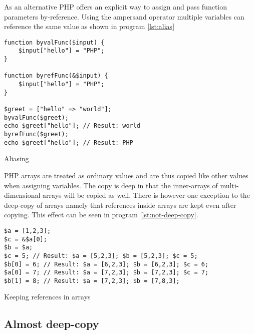 As an alternative PHP offers an explicit way to assign and pass function parameters by-reference. Using the ampersand operator multiple variables can reference the same value as shown in program \ref{lst:alias}

\begin{program}
\begin{lstlisting}
function byvalFunc($input) {
    $input["hello"] = "PHP";
}

function byrefFunc(&$input) {
    $input["hello"] = "PHP";
}

$greet = ["hello" => "world"];
byvalFunc($greet);
echo $greet["hello"]; // Result: world
byrefFunc($greet);
echo $greet["hello"]; // Result: PHP
\end{lstlisting}
\caption{Aliasing}
\label{lst:alias}
\end{program}

PHP arrays are treated as ordinary values and are thus copied like other values when assigning variables. The copy is deep in that the inner-arrays of multi-dimensional arrays will be copied as well. There is however one exception to the deep-copy of arrays namely that references inside arrays are kept even after copying. This effect can be seen in program \ref{lst:not-deep-copy}.

\begin{program}
\begin{lstlisting}
$a = [1,2,3];
$c = &$a[0];
$b = $a;
$c = 5; // Result: $a = [5,2,3]; $b = [5,2,3]; $c = 5;
$b[0] = 6; // Result: $a = [6,2,3]; $b = [6,2,3]; $c = 6;
$a[0] = 7; // Result: $a = [7,2,3]; $b = [7,2,3]; $c = 7;
$b[1] = 8; // Result: $a = [7,2,3]; $b = [7,8,3];
\end{lstlisting}
\caption{Keeping references in arrays}
\label{lst:not-deep-copy}
\end{program}

\subsection{Almost deep-copy}
